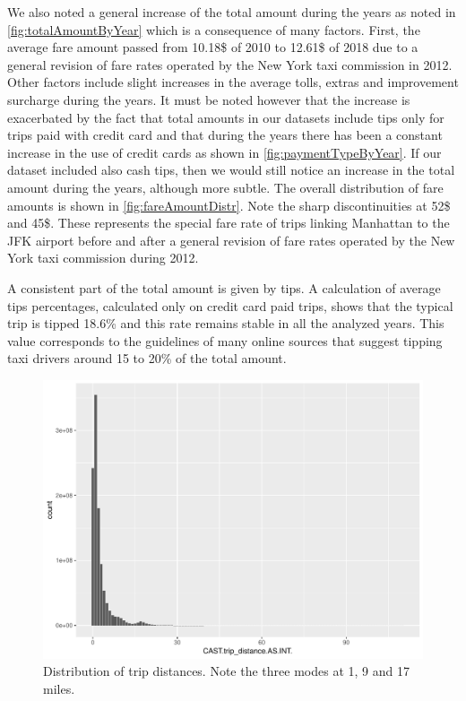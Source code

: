 \documentclass{acm_proc_article-sp-sigmod09}
\begin{document}
We also noted a general increase of the total amount during the years as noted in \cref{fig:totalAmountByYear} which is a consequence of many factors. First, the average fare amount passed from 10.18\$ of 2010 to 12.61\$ of 2018 due to a general revision of fare rates operated by the New York taxi commission in 2012. Other factors include slight increases in the average tolls, extras and improvement surcharge during the years. It must be noted however that the increase is exacerbated by the fact that total amounts in our datasets include tips only for trips paid with credit card and that during the years there has been a constant increase in the use of credit cards as shown in \cref{fig:paymentTypeByYear}. If our dataset included also cash tips, then we would still notice an increase in the total amount during the years, although more subtle.
The overall distribution of fare amounts is shown in \cref{fig:fareAmountDistr}. Note the sharp discontinuities at 52\$ and 45\$. These represents the special fare rate of trips linking Manhattan to the JFK airport before and after a general revision of fare rates operated by the New York taxi commission during 2012.

A consistent part of the total amount is given by tips. A calculation of average tips percentages, calculated only on credit card paid trips, shows that the typical trip is tipped 18.6\% and this rate remains stable in all the analyzed years. This value corresponds to the guidelines of many online sources that suggest tipping taxi drivers around 15 to 20\% of the total amount.

\begin{figure}
	\centering
	\includegraphics[width=1\columnwidth]{resources/base_plots/trip_distance_distr.pdf}
	\caption{Distribution of trip distances. Note the three modes at 1, 9 and 17 miles.}
	\label{fig:tripDistanceDistr}
\end{figure}
\end{document}

